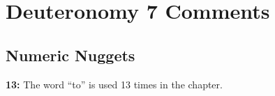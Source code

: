 \section{Deuteronomy 7 Comments}

\subsection{Numeric Nuggets}
\textbf{13: } The word ``to'' is used 13 times in the chapter.
